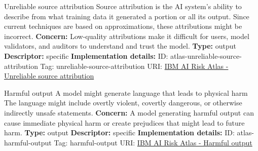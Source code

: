 \documentclass[a4paper,12pt]{article}
\begin{document}
\begin{definitionbox}{Unreliable source attribution}
Source attribution is the AI system's ability to describe from what training data it generated a portion or all its output. Since current techniques are based on approximations, these attributions might be incorrect.\newline\newline
\textbf{Concern: }Low-quality attributions make it difficult for users, model validators, and auditors to understand and trust the model.\newline\newline
\textbf{Type: }output\newline
\textbf{Descriptor: }specific \newline\newline
\textbf{Implementation details: } \newline
ID: atlas-unreliable-source-attribution \newline
Tag: unreliable-source-attribution \newline
URI:  \href{https://www.ibm.com/docs/en/watsonx/saas?topic=SSYOK8/wsj/ai-risk-atlas/unreliable-source-attribution.html}{IBM AI Risk Atlas - Unreliable source attribution}\newline
\end{definitionbox}
\begin{definitionbox}{Harmful output}
A model might generate language that leads to physical harm The language might include overtly violent, covertly dangerous, or otherwise indirectly unsafe statements.\newline\newline
\textbf{Concern: }A model generating harmful output can cause immediate physical harm or create prejudices that might lead to future harm.\newline\newline
\textbf{Type: }output\newline
\textbf{Descriptor: }specific \newline\newline
\textbf{Implementation details: } \newline
ID: atlas-harmful-output \newline
Tag: harmful-output \newline
URI:  \href{https://www.ibm.com/docs/en/watsonx/saas?topic=SSYOK8/wsj/ai-risk-atlas/harmful-output.html}{IBM AI Risk Atlas - Harmful output}\newline
\end{definitionbox}
\end{document}
